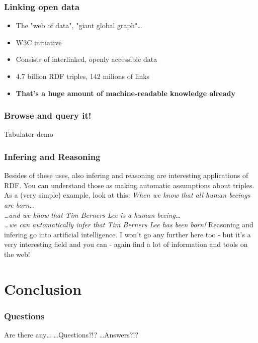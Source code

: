 \documentclass[handout]{beamer}
\begin{document}
       \begin{frame}
           \frametitle{Linking open data}
            \begin{itemize}           
               \item The "web of data", "giant global graph"\ldots
               \item W3C initiative
               \item Consists of interlinked, openly accessible data
               \item 4.7 billion RDF triples, 142 milions of links
               \item \textbf{That's a huge amount of machine-readable knowledge already}
            \end{itemize}
            
       \end{frame}

       \begin{frame}
           \frametitle{Browse and query it!}
           
           Tabulator demo
       \end{frame}

       \begin{frame}
           \frametitle{Infering and Reasoning}

           Besides of these uses, also infering and reasoning are interesting applications of RDF.
           \vskip 0.3cm
           \pause
           You can understand those as making automatic assumptions about triples.
           As a (very simple) example, look at this:
           \vskip 0.3cm
           \pause
           \textit{When we know that all human beeings are born\ldots\\
           \ldots and we know that Tim Berners Lee is a human beeing\ldots\\
           \ldots we can automatically infer that Tim Berners Lee has been born!}
           \vskip 0.3cm
           \pause
           Reasoning and infering go into artificial intelligence. I won't go any
           further here too - but it's a very interesting field and you can - again
           find a lot of information and tools on the web!
       \end{frame}

    \section{Conclusion}

      \begin{frame}
           \frametitle{Questions}

           Are there any\ldots
           \vskip 0.7cm
           \huge
           \ldots Questions?!?
           \vskip 0.7cm
           \huge
           \ldots Answers?!?
           \normalsize


       \end{frame}
\end{document}
